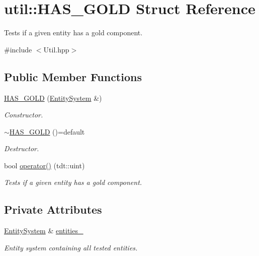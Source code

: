 \hypertarget{structutil_1_1_h_a_s___g_o_l_d}{}\section{util\+:\+:H\+A\+S\+\_\+\+G\+O\+LD Struct Reference}
\label{structutil_1_1_h_a_s___g_o_l_d}


Tests if a given entity has a gold component.  




{\ttfamily \#include $<$Util.\+hpp$>$}

\subsection*{Public Member Functions}
\begin{DoxyCompactItemize}
\item 
\hyperlink{structutil_1_1_h_a_s___g_o_l_d_a2678d4a6c013ad31ec6ea9c19584aa13}{H\+A\+S\+\_\+\+G\+O\+LD} (\hyperlink{class_entity_system}{Entity\+System} \&)
\begin{DoxyCompactList}\small\item\em Constructor. \end{DoxyCompactList}\item 
\hyperlink{structutil_1_1_h_a_s___g_o_l_d_a6ef2267d28435117f7cec3b2e157e56e}{$\sim$\+H\+A\+S\+\_\+\+G\+O\+LD} ()=default
\begin{DoxyCompactList}\small\item\em Destructor. \end{DoxyCompactList}\item 
bool \hyperlink{structutil_1_1_h_a_s___g_o_l_d_a6e0f0ec275fd0b6cdd1a4f03a170274f}{operator()} (tdt\+::uint)
\begin{DoxyCompactList}\small\item\em Tests if a given entity has a gold component. \end{DoxyCompactList}\end{DoxyCompactItemize}
\subsection*{Private Attributes}
\begin{DoxyCompactItemize}
\item 
\hyperlink{class_entity_system}{Entity\+System} \& \hyperlink{structutil_1_1_h_a_s___g_o_l_d_a2201e48e29a16c4ede9d07b2b0f7b430}{entities\+\_\+}
\begin{DoxyCompactList}\small\item\em Entity system containing all tested entities. \end{DoxyCompactList}\end{DoxyCompactItemize}


